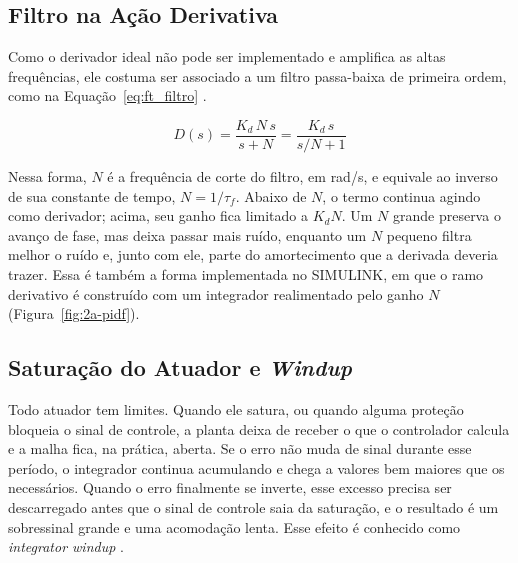 \documentclass[a4paper,12pt]{article}
\begin{document}
\subsection{Filtro na Ação Derivativa}

\begin{justify}
    \hspace{4ex}Como o derivador ideal não pode ser implementado e amplifica as altas frequências, ele costuma ser associado a um filtro passa-baixa de primeira ordem, como na Equação~\eqref{eq:ft_filtro} \cite{astrom2006}.
\end{justify}

\begin{equation}
    D(s) = \frac{K_d\, N\, s}{s + N} = \frac{K_d\, s}{s/N + 1}
    \label{eq:ft_filtro}
\end{equation}

\begin{justify}
    \hspace{4ex}Nessa forma, $N$ é a frequência de corte do filtro, em rad/s, e equivale ao inverso de sua constante de tempo, $N = 1/\tau_f$. Abaixo de $N$, o termo continua agindo como derivador; acima, seu ganho fica limitado a $K_d N$. Um $N$ grande preserva o avanço de fase, mas deixa passar mais ruído, enquanto um $N$ pequeno filtra melhor o ruído e, junto com ele, parte do amortecimento que a derivada deveria trazer. Essa é também a forma implementada no SIMULINK, em que o ramo derivativo é construído com um integrador realimentado pelo ganho $N$ (Figura~\ref{fig:2a-pidf}).
\end{justify}

\subsection{Saturação do Atuador e \textit{Windup}}

\begin{justify}
    \hspace{4ex}Todo atuador tem limites. Quando ele satura, ou quando alguma proteção bloqueia o sinal de controle, a planta deixa de receber o que o controlador calcula e a malha fica, na prática, aberta. Se o erro não muda de sinal durante esse período, o integrador continua acumulando e chega a valores bem maiores que os necessários. Quando o erro finalmente se inverte, esse excesso precisa ser descarregado antes que o sinal de controle saia da saturação, e o resultado é um sobressinal grande e uma acomodação lenta. Esse efeito é conhecido como \textit{integrator windup} \cite{astrom2006}.
\end{justify}
\end{document}
